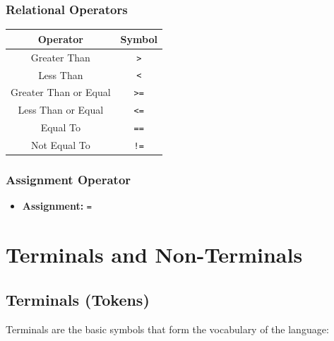 \documentclass[12pt,a4paper]{report}
\begin{document}
\subsubsection{Relational Operators}
\begin{center}
\begin{tabular}{|c|c|}
\hline
\textbf{Operator} & \textbf{Symbol} \\
\hline
Greater Than & \texttt{>} \\
\hline
Less Than & \texttt{<} \\
\hline
Greater Than or Equal & \texttt{>=} \\
\hline
Less Than or Equal & \texttt{<=} \\
\hline
Equal To & \texttt{==} \\
\hline
Not Equal To & \texttt{!=} \\
\hline
\end{tabular}
\end{center}

\subsubsection{Assignment Operator}
\begin{itemize}
    \item \textbf{Assignment:} \texttt{=}
\end{itemize}

\section{Terminals and Non-Terminals}

\subsection{Terminals (Tokens)}
Terminals are the basic symbols that form the vocabulary of the language:
\end{document}
